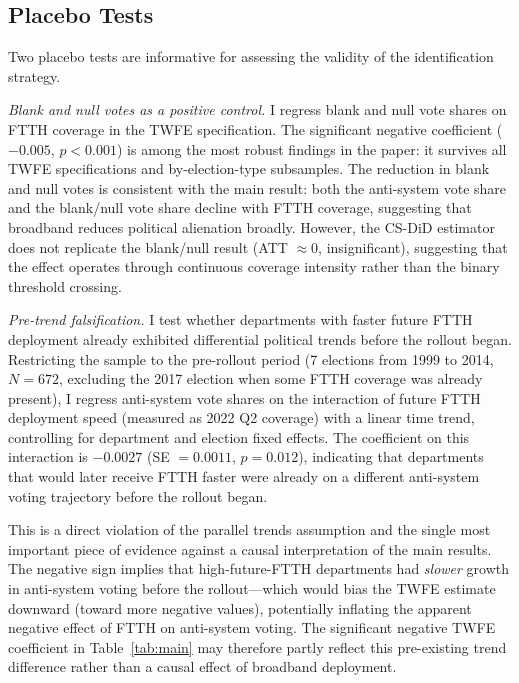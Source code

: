 \documentclass[12pt]{article}
\begin{document}
\subsection{Placebo Tests}

Two placebo tests are informative for assessing the validity of the identification strategy.

\emph{Blank and null votes as a positive control.} I regress blank and null vote shares on FTTH coverage in the TWFE specification. The significant negative coefficient ($-0.005$, $p < 0.001$) is among the most robust findings in the paper: it survives all TWFE specifications and by-election-type subsamples. The reduction in blank and null votes is consistent with the main result: both the anti-system vote share and the blank/null vote share decline with FTTH coverage, suggesting that broadband reduces political alienation broadly. However, the CS-DiD estimator does not replicate the blank/null result (ATT $\approx 0$, insignificant), suggesting that the effect operates through continuous coverage intensity rather than the binary threshold crossing.

\emph{Pre-trend falsification.} I test whether departments with faster future FTTH deployment already exhibited differential political trends before the rollout began. Restricting the sample to the pre-rollout period (7 elections from 1999 to 2014, $N = 672$, excluding the 2017 election when some FTTH coverage was already present), I regress anti-system vote shares on the interaction of future FTTH deployment speed (measured as 2022 Q2 coverage) with a linear time trend, controlling for department and election fixed effects. The coefficient on this interaction is $-0.0027$ (SE $= 0.0011$, $p = 0.012$), indicating that departments that would later receive FTTH faster were already on a different anti-system voting trajectory before the rollout began.

This is a direct violation of the parallel trends assumption and the single most important piece of evidence against a causal interpretation of the main results. The negative sign implies that high-future-FTTH departments had \emph{slower} growth in anti-system voting before the rollout---which would bias the TWFE estimate downward (toward more negative values), potentially inflating the apparent negative effect of FTTH on anti-system voting. The significant negative TWFE coefficient in Table~\ref{tab:main} may therefore partly reflect this pre-existing trend difference rather than a causal effect of broadband deployment.
\end{document}
